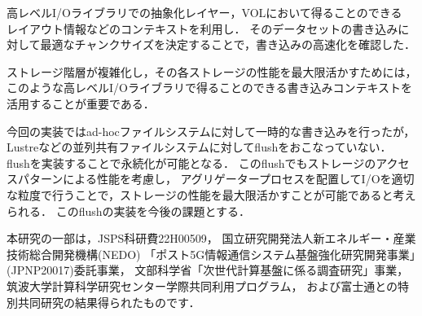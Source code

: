 \documentclass[submit,techrep,noauthor]{ipsj}
\begin{document}
高レベルI/Oライブラリでの抽象化レイヤー，VOLにおいて得ることのできる
レイアウト情報などのコンテキストを利用し．
そのデータセットの書き込みに対して最適なチャンクサイズを決定することで，書き込みの高速化を確認した．

ストレージ階層が複雑化し，その各ストレージの性能を最大限活かすためには，
このような高レベルI/Oライブラリで得ることのできる書き込みコンテキストを活用することが重要である．

今回の実装ではad-hocファイルシステムに対して一時的な書き込みを行ったが，Lustreなどの並列共有ファイルシステムに対してflushをおこなっていない．
flushを実装することで永続化が可能となる．
このflushでもストレージのアクセスパターンによる性能を考慮し，
アグリゲータープロセスを配置してI/Oを適切な粒度で行うことで，ストレージの性能を最大限活かすことが可能であると考えられる．
このflushの実装を今後の課題とする．

\begin{acknowledgment}
	本研究の一部は，JSPS科研費22H00509，
	国立研究開発法人新エネルギー・産業技術総合開発機構(NEDO)
	「ポスト5G情報通信システム基盤強化研究開発事業」(JPNP20017)委託事業，
	文部科学省「次世代計算基盤に係る調査研究」事業，
	筑波大学計算科学研究センター学際共同利用プログラム，
	および富士通との特別共同研究の結果得られたものです．
\end{acknowledgment}




\end{document}
